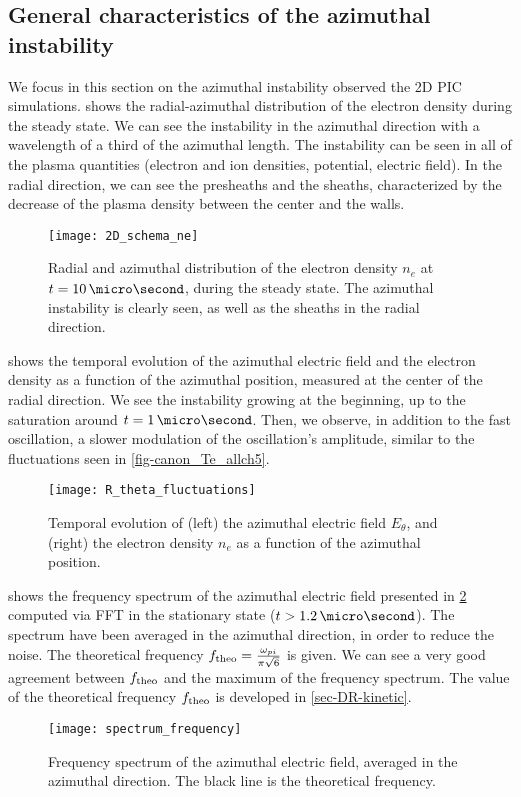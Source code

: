   \subsection{General characteristics of the azimuthal instability }
  We focus in this section on the azimuthal instability observed the \ac{2D} \ac{PIC} simulations.
   shows the radial-azimuthal distribution of the electron density during the steady state.
  We can see the instability in the azimuthal direction with a wavelength of a third of the azimuthal length.
  The instability can be seen in all of the plasma quantities (electron and ion densities, potential, electric field).
  In the radial direction, we can see the presheaths and the sheaths, characterized by the decrease of the plasma density between the center and the walls.

  \begin{figure}[hbtp]
    \centering
    \texttt{[image: 2D\_schema\_ne]}
    \caption{Radial and azimuthal distribution of the electron density $n_e$ at $t=10\,\micro\second$, during the steady state. The azimuthal instability is clearly seen, as well as the sheaths in the radial direction. }
    \label{fig-2D_ne}
  \end{figure}
  
   shows the temporal evolution of the azimuthal electric field and the electron density as a function of the azimuthal position, measured at the center of the radial direction.
  We see the instability growing at the beginning, up to the saturation around $t=1\,\micro\second$.
  Then, we observe, in addition to the fast oscillation, a slower modulation of the oscillation's amplitude, similar to the fluctuations seen in \cref{fig-canon_Te_allch5}.
  \begin{figure}[!hbt]
    \centering
    \texttt{[image: R\_theta\_fluctuations]}
    \caption{Temporal evolution of (left) the azimuthal electric field $E_{\theta}$, and (right) the electron density $n_e$ as a function of the azimuthal position.}
    \label{fig-2DcutEx}
  \end{figure}

   shows the frequency spectrum of the azimuthal electric field presented in \cref{fig-2DcutEx} computed via \ac{FFT} in the stationary state ($t > 1.2\,\micro\second$).
  The spectrum have been averaged in the azimuthal direction, in order to reduce the noise.
  The theoretical frequency $f_{\rm theo} = \frac{\omega_{pi}}{\pi \sqrt{6} }$ \citep{croes2018} is given. 
  We can see a very good agreement between $f_{\rm theo}$ and the maximum of the frequency spectrum.
  The value of the theoretical frequency $f_{\rm theo}$ is developed in \cref{sec-DR-kinetic}.
  \begin{figure}[!hbt]
    \centering
    \texttt{[image: spectrum\_frequency]}
    \caption{Frequency spectrum of the azimuthal electric field, averaged in the azimuthal direction. The black line is the theoretical frequency.}
    \label{fig-FFT_ex}
  \end{figure}
  
